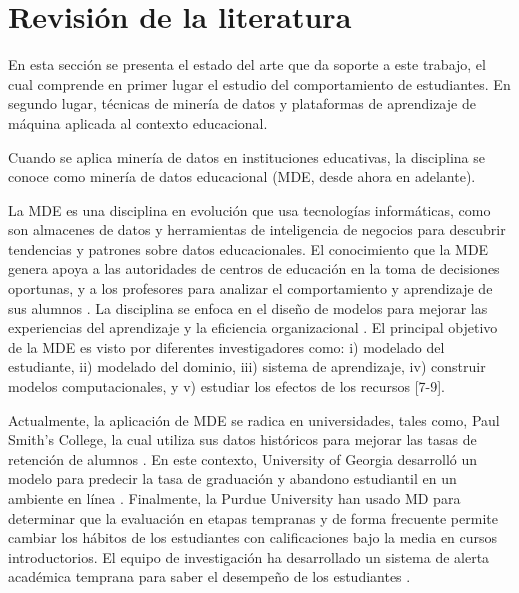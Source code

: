 \section{Revisión de la literatura}
\label{sec:revision-literatura}
En esta sección se presenta el estado del arte que da soporte a este trabajo, el cual comprende en primer lugar el estudio del comportamiento de estudiantes. En segundo lugar, técnicas de minería de datos y plataformas de aprendizaje de máquina aplicada al contexto educacional.


Cuando se aplica minería de datos en instituciones educativas, la disciplina se conoce como minería de datos educacional (MDE, desde ahora en adelante).

La MDE es una disciplina en evolución que usa tecnologías informáticas, como son almacenes de datos y herramientas de inteligencia de negocios para descubrir tendencias y patrones sobre datos educacionales. El conocimiento que la MDE genera apoya a las autoridades de centros de educación en la toma de decisiones oportunas, y a los profesores para analizar el comportamiento y aprendizaje de sus alumnos \parencite{romero2010educational}. La disciplina se enfoca en el diseño de modelos para mejorar las experiencias del aprendizaje y la eficiencia organizacional \parencite{pandey2013decision}. El principal objetivo de la MDE es visto por diferentes investigadores como: i) modelado del estudiante, ii) modelado del dominio, iii) sistema de aprendizaje, iv) construir modelos computacionales, y v) estudiar los efectos de los recursos [7-9].

Actualmente, la aplicación de MDE se radica en universidades, tales como, Paul Smith’s College, la cual utiliza sus datos históricos para mejorar las tasas de retención de alumnos \parencite{bichsel2012analytics}. En este contexto, University of Georgia desarrolló un modelo para predecir la tasa de graduación y abandono estudiantil en un ambiente en línea \parencite{morris2005predicting}. Finalmente, la Purdue University han usado MD para determinar que la evaluación en etapas tempranas y de forma frecuente permite cambiar los hábitos de los estudiantes con calificaciones bajo la media en cursos introductorios. El equipo de investigación ha desarrollado un sistema de alerta académica temprana para saber el desempeño de los estudiantes \cite{baepler2010academic}. 


